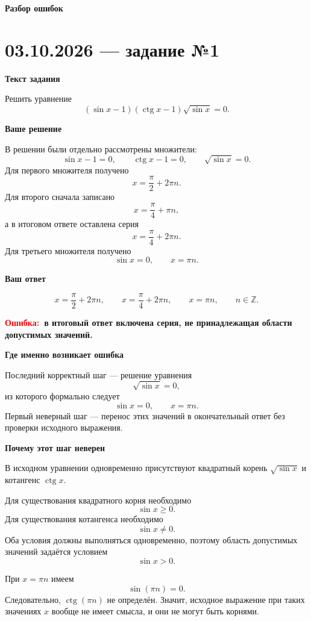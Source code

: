 \documentclass[12pt,a4paper]{article}
\newcommand{\err}{\textcolor{red}{Ошибка:}}
\begin{document}
\newpage
\thispagestyle{empty}
\vspace*{\fill}
\begin{center}
{\LARGE\bfseries Разбор ошибок}
\end{center}
\vspace*{\fill}
\newpage

\label{task:0310-1}
\section*{03.10.2026 — задание №1}

\textbf{Текст задания}

Решить уравнение
\[
(\sin x-1)(\operatorname{ctg}x-1)\sqrt{\sin x}=0.
\]

\textbf{Ваше решение}

В решении были отдельно рассмотрены множители:
\[
\sin x-1=0,\qquad
\operatorname{ctg}x-1=0,\qquad
\sqrt{\sin x}=0.
\]
Для первого множителя получено
\[
x=\frac{\pi}{2}+2\pi n.
\]
Для второго сначала записано
\[
x=\frac{\pi}{4}+\pi n,
\]
а в итоговом ответе оставлена серия
\[
x=\frac{\pi}{4}+2\pi n.
\]
Для третьего множителя получено
\[
\sin x=0,\qquad x=\pi n.
\]

\textbf{Ваш ответ}

\[
x=\frac{\pi}{2}+2\pi n,\qquad
x=\frac{\pi}{4}+2\pi n,\qquad
x=\pi n,\qquad n\in\mathbb Z.
\]

\textbf{\err\ в итоговый ответ включена серия, не принадлежащая области допустимых значений.}

\textbf{Где именно возникает ошибка}

Последний корректный шаг --- решение уравнения
\[
\sqrt{\sin x}=0,
\]
из которого формально следует
\[
\sin x=0,\qquad x=\pi n.
\]
Первый неверный шаг --- перенос этих значений в окончательный ответ без проверки исходного выражения.

\textbf{Почему этот шаг неверен}

В исходном уравнении одновременно присутствуют квадратный корень
\(\sqrt{\sin x}\) и котангенс \(\operatorname{ctg}x\).

Для существования квадратного корня необходимо
\[
\sin x\ge 0.
\]
Для существования котангенса необходимо
\[
\sin x\ne 0.
\]
Оба условия должны выполняться одновременно, поэтому область допустимых значений задаётся условием
\[
\sin x>0.
\]

При \(x=\pi n\) имеем
\[
\sin(\pi n)=0.
\]
Следовательно, \(\operatorname{ctg}(\pi n)\) не определён. Значит, исходное выражение при таких значениях \(x\) вообще не имеет смысла, и они не могут быть корнями.
\end{document}
